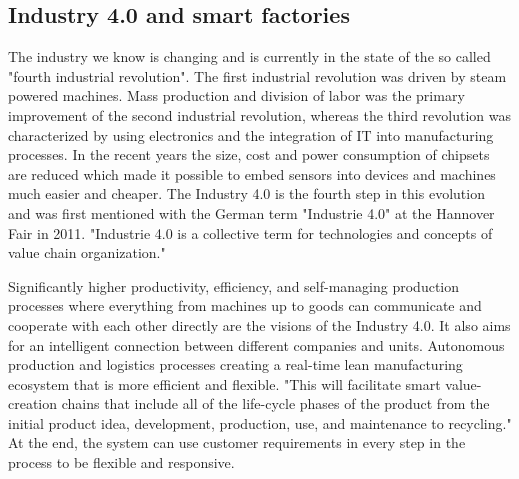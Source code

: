 \subsection{Industry 4.0 and smart factories}
The industry we know is changing and is currently in the state of the so called "fourth industrial revolution".
The first industrial revolution was driven by steam powered machines.
Mass production and division of labor was the primary improvement of the second industrial revolution, whereas the third revolution was characterized by using electronics and the integration of \ac{IT} into manufacturing processes.\autocite[cf.][p. 1]{Lom:2016}
In the recent years the size, cost and power consumption of chipsets are reduced which made it possible to embed sensors into devices and machines much easier and cheaper.\autocite[cf.][p. 1]{Brito:2016}
The Industry 4.0 is the fourth step in this evolution and was first mentioned with the German term "Industrie 4.0" at the Hannover Fair in 2011.\autocite[cf.][p. 1]{Lom:2016}
"Industrie 4.0 is a collective term for technologies and concepts of value chain organization."\autocite[cf.][p. 11]{Her:2015}

Significantly higher productivity, efficiency, and self-managing production processes where everything from machines up to goods can communicate and cooperate with each other directly are the visions of the Industry 4.0.\autocite[cf.]{Lyd:2016}
It also aims for an intelligent connection between different companies and units.
Autonomous production and logistics processes creating a real-time lean manufacturing ecosystem that is more efficient and flexible.\autocite[cf.]{Lyd:2016}
"This will facilitate smart value-creation chains that include all of the life-cycle phases of the product from the initial product idea, development, production, use, and maintenance to recycling."\autocite{Lyd:2016}
At the end, the system can use customer requirements in every step in the process to be flexible and responsive.\autocite[cf.]{Lyd:2016}

